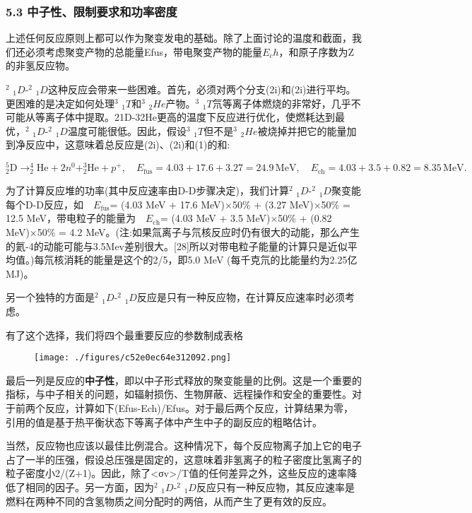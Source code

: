\subsubsection{5.3 中子性、限制要求和功率密度}
上述任何反应原则上都可以作为聚变发电的基础。除了上面讨论的温度和截面，我们还必须考虑聚变产物的总能量Efus，带电聚变产物的能量$E_ch$，和原子序数为Z的非氢反应物。

$^{2}$ $_{1}D$-$^{2}$ $_{1}D$这种反应会带来一些困难。首先，必须对两个分支(2i)和(2i)进行平均。更困难的是决定如何处理$^{3}$ $_{1}T$和$^{3}$ $_{2}He$产物。$^{3}$ $_{1}T$氘等离子体燃烧的非常好，几乎不可能从等离子体中提取。21D-32He更高的温度下反应进行优化，使燃耗达到最优，$^{2}$ $_{1}D$-$^{2}$ $_{1}D$温度可能很低。因此，假设$^{3}$ $_{1}T$但不是$^{3}$ $_{2}He$被烧掉并把它的能量加到净反应中，这意味着总反应是(2i)、(2i)和(1)的和:

$$^{5}_{2}\text{D} \rightarrow ^{4}_{2}\text{He} + 2n^{0} + ^{3}_{2}\text{He} + p^{+}, \quad E_{\text{fus}} = 4.03 + 17.6 + 3.27 = 24.9 \, \text{MeV}, \quad E_{\text{ch}} = 4.03 + 3.5 + 0.82 = 8.35 \, \text{MeV}.~$$

为了计算反应堆的功率(其中反应速率由D-D步骤决定)，我们计算$^{2}$ $_{1}D$-$^{2}$ $_{1}D$聚变能每个D-D反应，如$\quad E_{\text{fus}}$= (4.03 MeV + 17.6 MeV)×50\% + (3.27 MeV)×50\% = 12.5 MeV，带电粒子的能量为$\quad E_{\text{ch}}$= (4.03 MeV + 3.5 MeV)×50\% + (0.82 MeV)×50\% = 4.2 MeV。(注:如果氚离子与氘核反应时仍有很大的动能，那么产生的氦-4的动能可能与3.5Mev差别很大。[28]所以对带电粒子能量的计算只是近似平均值。)每氘核消耗的能量是这个的2/5，即5.0 MeV (每千克氘的比能量约为2.25亿MJ)。

另一个独特的方面是$^{2}$ $_{1}D$-$^{2}$ $_{1}D$反应是只有一种反应物，在计算反应速率时必须考虑。

有了这个选择，我们将四个最重要反应的参数制成表格
\begin{figure}[ht]
\centering
\texttt{[image: ./figures/c52e0ec64e312092.png]}
\caption\label{fig_HJB_9}
\end{figure}
最后一列是反应的\textbf{中子性}，即以中子形式释放的聚变能量的比例。这是一个重要的指标，与中子相关的问题，如辐射损伤、生物屏蔽、远程操作和安全的重要性。对于前两个反应，计算如下(Efus-Ech)/Efus。对于最后两个反应，计算结果为零，引用的值是基于热平衡状态下等离子体中产生中子的副反应的粗略估计。

当然，反应物也应该以最佳比例混合。这种情况下，每个反应物离子加上它的电子占了一半的压强，假设总压强是固定的，这意味着非氢离子的粒子密度比氢离子的粒子密度小2/(Z+1)。因此，除了<σv>/T值的任何差异之外，这些反应的速率降低了相同的因子。另一方面，因为$^{2}$ $_{1}D$-$^{2}$ $_{1}D$反应只有一种反应物，其反应速率是燃料在两种不同的含氢物质之间分配时的两倍，从而产生了更有效的反应。

